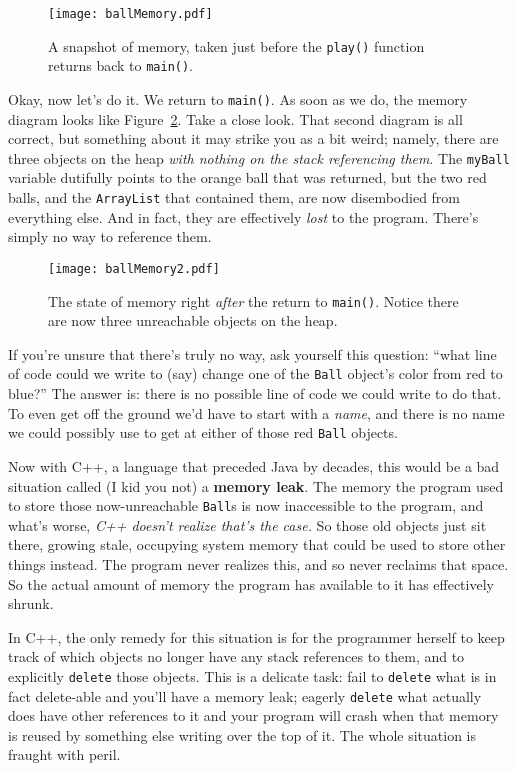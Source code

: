 \begin{figure}[ht]
\centering
\texttt{[image: ballMemory.pdf]}    %
\caption{A snapshot of memory, taken just before the \texttt{play()} function
returns back to \texttt{main()}.}
\label{fig:ballMemory}
\end{figure}

Okay, now let's do it. We return to \texttt{main()}. As soon as we do, the
memory diagram looks like Figure~\ref{fig:ballMemory2}. Take a close look.
That second diagram is all correct, but something about it may strike you as a
bit weird; namely, there are three objects on the heap \textit{with nothing on
the stack referencing them}. The \texttt{myBall} variable dutifully points to
the orange ball that was returned, but the two red balls, and the
\texttt{ArrayList} that contained them, are now disembodied from everything
else. And in fact, they are effectively \textit{lost} to the program. There's
simply no way to reference them. 

\begin{figure}[ht]
\centering
\texttt{[image: ballMemory2.pdf]}    %
\caption{The state of memory right \textit{after} the return to
\texttt{main()}. Notice there are now three unreachable objects on the heap.}
\label{fig:ballMemory2}
\end{figure}

If you're unsure that there's truly no way, ask yourself this question: ``what
line of code could we write to (say) change one of the \texttt{Ball} object's
color from red to blue?'' The answer is: there is no possible line of code we
could write to do that. To even get off the ground we'd have to start with a
\textit{name}, and there is no name we could possibly use to get at either of
those red \texttt{Ball} objects.

Now with C++, a language that preceded Java by decades, this would be a bad
situation called (I kid you not) a \textbf{memory leak}. The memory the
program used to store those now-unreachable \texttt{Ball}s is now inaccessible
to the program, and what's worse, \textit{C++ doesn't realize that's the
case.} So those old objects just sit there, growing stale, occupying system
memory that could be used to store other things instead. The program never
realizes this, and so never reclaims that space. So the actual amount of
memory the program has available to it has effectively shrunk.

In C++, the only remedy for this situation is for the programmer herself to
keep track of which objects no longer have any stack references to them, and
to explicitly \texttt{delete} those objects. This is a delicate task: fail to
\texttt{delete} what is in fact delete-able and you'll have a memory leak;
eagerly \texttt{delete} what actually does have other references to it and
your program will crash when that memory is reused by something else writing
over the top of it. The whole situation is fraught with peril.

